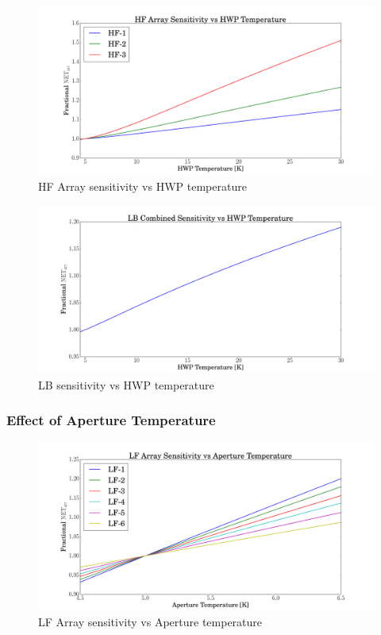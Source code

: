 \documentclass[12pt, titlepage]{article} %
\begin{document}
\begin{figure}[H]
	\centering
	\includegraphics[width=1.1\textwidth, center]{PDF/TempDependence_HWP_HF.pdf}
	\caption{HF Array sensitivity vs HWP temperature}
\end{figure}

\begin{figure}[H]
	\centering
	\includegraphics[width=1.1\textwidth, center]{PDF/TempDependence_HWP_LB.pdf}
	\caption{LB sensitivity vs HWP temperature}
\end{figure}


\subsubsection{Effect of Aperture Temperature}

\begin{figure}[H]
	\centering
	\includegraphics[width=1.1\textwidth, center]{PDF/TempDependence_Aperture_LF.pdf}
	\caption{LF Array sensitivity vs Aperture temperature}
\end{figure}
\end{document}
